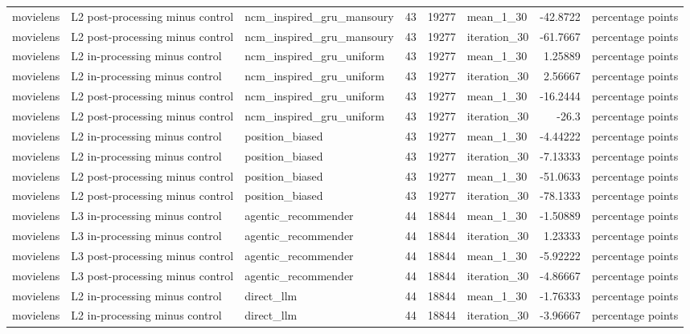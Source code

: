 \begin{table}[htbp!]
\begin{tabular}{lllrrlrl}
movielens & L2 post-processing minus control & ncm\_inspired\_gru\_mansoury & 43 & 19277 & mean\_1\_30 & -42.8722 & percentage points \\
movielens & L2 post-processing minus control & ncm\_inspired\_gru\_mansoury & 43 & 19277 & iteration\_30 & -61.7667 & percentage points \\
movielens & L2 in-processing minus control & ncm\_inspired\_gru\_uniform & 43 & 19277 & mean\_1\_30 & 1.25889 & percentage points \\
movielens & L2 in-processing minus control & ncm\_inspired\_gru\_uniform & 43 & 19277 & iteration\_30 & 2.56667 & percentage points \\
movielens & L2 post-processing minus control & ncm\_inspired\_gru\_uniform & 43 & 19277 & mean\_1\_30 & -16.2444 & percentage points \\
movielens & L2 post-processing minus control & ncm\_inspired\_gru\_uniform & 43 & 19277 & iteration\_30 & -26.3 & percentage points \\
movielens & L2 in-processing minus control & position\_biased & 43 & 19277 & mean\_1\_30 & -4.44222 & percentage points \\
movielens & L2 in-processing minus control & position\_biased & 43 & 19277 & iteration\_30 & -7.13333 & percentage points \\
movielens & L2 post-processing minus control & position\_biased & 43 & 19277 & mean\_1\_30 & -51.0633 & percentage points \\
movielens & L2 post-processing minus control & position\_biased & 43 & 19277 & iteration\_30 & -78.1333 & percentage points \\
movielens & L3 in-processing minus control & agentic\_recommender & 44 & 18844 & mean\_1\_30 & -1.50889 & percentage points \\
movielens & L3 in-processing minus control & agentic\_recommender & 44 & 18844 & iteration\_30 & 1.23333 & percentage points \\
movielens & L3 post-processing minus control & agentic\_recommender & 44 & 18844 & mean\_1\_30 & -5.92222 & percentage points \\
movielens & L3 post-processing minus control & agentic\_recommender & 44 & 18844 & iteration\_30 & -4.86667 & percentage points \\
movielens & L2 in-processing minus control & direct\_llm & 44 & 18844 & mean\_1\_30 & -1.76333 & percentage points \\
movielens & L2 in-processing minus control & direct\_llm & 44 & 18844 & iteration\_30 & -3.96667 & percentage points \\

\end{tabular}
\end{table}
